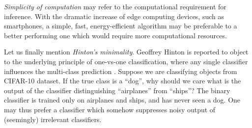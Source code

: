 \emph{Simplicity of computation}  may refer to the computational requirement for inference. With the dramatic increase of edge computing devices, such as smartphones, a simple, fast, energy-efficient algorithm may be preferable to a better performing one which would require more computational resources. 

Let us finally mention \emph{Hinton's minimality}. Geoffrey Hinton is reported to object to the underlying principle of one-vs-one classification, where any single classifier influences the multi-class prediction \cite[p.~467]{hastie1998classification}. Suppose we are classifying objects from CIFAR-10 dataset.  If the true class is  a ``dog'', why should we care what is the output of the classifier distinguishing ``airplanes'' from ``ships''? The binary classifier is trained only on airplanes and ships, and has never seen a dog. One may thus prefer a classifier which somehow suppresses noisy output of (seemingly) irrelevant classifiers.




